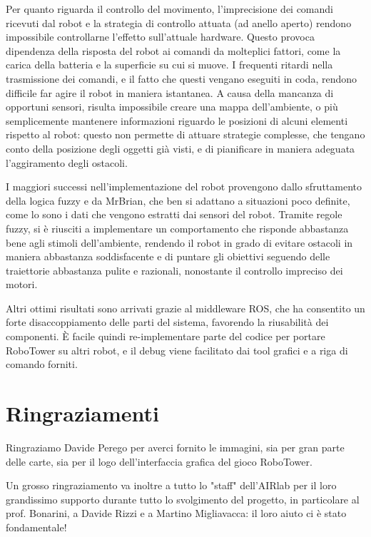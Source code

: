 Per quanto riguarda il controllo del movimento, l'imprecisione dei comandi ricevuti dal robot e la strategia di controllo attuata (ad anello aperto) rendono impossibile controllarne l'effetto sull'attuale hardware. Questo provoca dipendenza della risposta del robot ai comandi da molteplici fattori, come la carica della batteria e la superficie su cui si muove. I frequenti ritardi nella trasmissione dei comandi, e il fatto che questi vengano eseguiti in coda, rendono difficile far agire il robot in maniera istantanea. A causa della mancanza di opportuni sensori, risulta impossibile creare una mappa dell'ambiente, o più semplicemente mantenere informazioni riguardo le posizioni di alcuni elementi rispetto al robot: questo non permette di attuare strategie complesse, che tengano conto della posizione degli oggetti già visti, e di pianificare in maniera adeguata l'aggiramento degli ostacoli.

I maggiori successi nell'implementazione del robot provengono dallo sfruttamento della logica fuzzy e da MrBrian, che ben si adattano a situazioni poco definite, come lo sono i dati che vengono estratti dai sensori del robot. Tramite regole fuzzy, si è riusciti a implementare un comportamento che risponde abbastanza bene agli stimoli dell'ambiente, rendendo il robot in grado di evitare ostacoli in maniera abbastanza soddisfacente e di puntare gli obiettivi seguendo delle traiettorie abbastanza pulite e razionali, nonostante il controllo impreciso dei motori.

Altri ottimi risultati sono arrivati grazie al middleware ROS, che ha consentito un forte disaccoppiamento delle parti del sistema, favorendo la riusabilità dei componenti. È facile quindi re-implementare parte del codice per portare RoboTower su altri robot, e il debug viene facilitato dai tool grafici e a riga di comando forniti.

\section*{Ringraziamenti}

Ringraziamo Davide Perego per averci fornito le immagini, sia per gran parte delle carte, sia per il logo dell'interfaccia grafica del gioco RoboTower.

Un grosso ringraziamento va inoltre a tutto lo "staff" dell'AIRlab per il loro grandissimo supporto durante tutto lo svolgimento del progetto, in particolare al prof. Bonarini, a Davide Rizzi e a Martino Migliavacca: il loro aiuto ci è stato fondamentale!